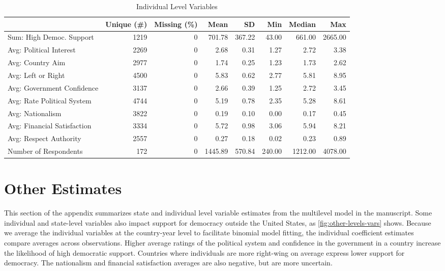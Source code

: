 \documentclass[12pt]{article}
\begin{document}
\begin{table}
\caption{\label{tab:wvs-vars}Individual Level Variables}
\begin{adjustbox}{width= .95\textwidth, center}
\begin{tabular}[t]{lrrrrrrr}
\toprule
  & Unique (\#) & Missing (\%) & Mean & SD & Min & Median & Max\\
\midrule
Sum: High Democ. Support & 1219 & 0 & 701.78 & 367.22 & 43.00 & 661.00 & 2665.00\\
Avg: Political Interest & 2269 & 0 & 2.68 & 0.31 & 1.27 & 2.72 & 3.38\\
Avg: Country Aim & 2977 & 0 & 1.74 & 0.25 & 1.23 & 1.73 & 2.62\\
Avg: Left or Right & 4500 & 0 & 5.83 & 0.62 & 2.77 & 5.81 & 8.95\\
Avg: Government Confidence & 3137 & 0 & 2.66 & 0.39 & 1.25 & 2.72 & 3.45\\
Avg: Rate Political System & 4744 & 0 & 5.19 & 0.78 & 2.35 & 5.28 & 8.61\\
Avg: Nationalism & 3822 & 0 & 0.19 & 0.10 & 0.00 & 0.17 & 0.45\\
Avg: Financial Satisfaction & 3334 & 0 & 5.72 & 0.98 & 3.06 & 5.94 & 8.21\\
Avg: Respect Authority & 2557 & 0 & 0.27 & 0.18 & 0.02 & 0.23 & 0.89\\
Number of Respondents & 172 & 0 & 1445.89 & 570.84 & 240.00 & 1212.00 & 4078.00\\
\bottomrule
\end{tabular}
\end{adjustbox}
\end{table}


\newpage 


\section{Other Estimates}


This section of the appendix summarizes state and individual level variable estimates from the multilevel model in the manuscript.
Some individual and state-level variables also impact support for democracy outside the United States, as \autoref{fig:other-levels-vars} shows. 
Because we average the individual variables at the country-year level to facilitate binomial model fitting, the individual coefficient estimates compare averages across observations.
Higher average ratings of the political system and confidence in the government in a country increase the likelihood of high democratic support. 
Countries where individuals are more right-wing on average express lower support for democracy. 
The nationalism and financial satisfaction averages are also negative, but are more uncertain. 
\end{document}
